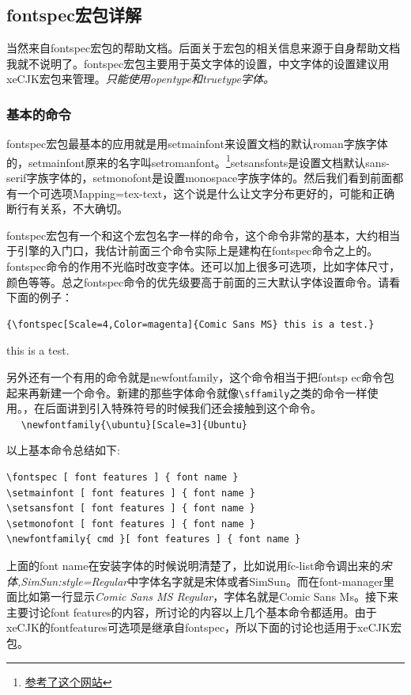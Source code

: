 \documentclass[12pt,oneside]{book}
\begin{document}
\begin{common-format}
\subsection{fontspec宏包详解}
当然来自fontspec宏包的帮助文档。后面关于宏包的相关信息来源于自身帮助文档我就不说明了。fontspec宏包主要用于英文字体的设置，中文字体的设置建议用xeCJK宏包来管理。\emph{\XeLaTeX 只能使用opentype和truetype字体。}

\subsubsection{基本的命令}
fontspec宏包最基本的应用就是用setmainfont来设置文档的默认roman字族字体的，setmainfont原来的名字叫setromanfont。\footnote{\href{http://tex.stackexchange.com/questions/70413/problem-with-xetex-latex-and-system-fonts}{参考了这个网站}}setsansfonts是设置文档默认sans-serif字族字体的，setmonofont是设置monospace字族字体的。然后我们看到前面都有一个可选项Mapping=tex-text，这个说是什么让\XeTeX 文字分布更好的，可能和正确断行有关系，不大确切。

fontspec宏包有一个和这个宏包名字一样的命令，这个命令非常的基本，大约相当于引擎的入门口，我估计前面三个命令实际上是建构在fontspec命令之上的。fontspec命令的作用不光临时改变字体。还可以加上很多可选项，比如字体尺寸，颜色等等。总之fontspec命令的优先级要高于前面的三大默认字体设置命令。请看下面的例子：
\begin{Verbatim}
{\fontspec[Scale=4,Color=magenta]{Comic Sans MS} this is a test.} 
\end{Verbatim}
{ this is a test.} 

另外还有一个有用的命令就是newfontfamily，这个命令相当于把fontsp\- ec命令包起来再新建一个命令。新建的那些字体命令就像\verb+\sffamily+之类的命令一样使用。，在后面讲到引入特殊符号的时候我们还会接触到这个命令。\\　
\verb+\newfontfamily{\ubuntu}[Scale=3]{Ubuntu}+

以上基本命令总结如下:
\begin{Verbatim}
\fontspec [ font features ] { font name }
\setmainfont [ font features ] { font name }
\setsansfont [ font features ] { font name }
\setmonofont [ font features ] { font name }
\newfontfamily{ cmd }[ font features ] { font name }
\end{Verbatim}

上面的font name在安装字体的时候说明清楚了，比如说用fc-list命令调出来的\textit{宋体,SimSun:style=Regular}中字体名字就是宋体或者SimSun。而在font-manager里面比如第一行显示\textit{Comic Sans MS Regular}，字体名就是Comic Sans Ms。接下来主要讨论font features的内容，所讨论的内容以上几个基本命令都适用。由于xeCJK的fontfeatures可选项是继承自fontspec，所以下面的讨论也适用于xeCJK宏包。


\end{common-format}
\end{document}
